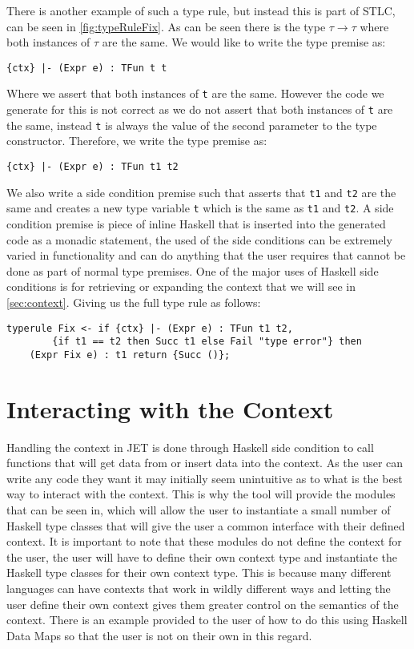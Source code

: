 There is another example of such a type rule, but instead this is part of STLC, can be seen in \autoref{fig:typeRuleFix}.
As can be seen there is the type $\tau \rightarrow \tau$ where both instances of $\tau$ are the same.
We would like to write the type premise as:
\begin{lstlisting}[numbers=none]
{ctx} |- (Expr e) : TFun t t
\end{lstlisting}
Where we assert that both instances of \texttt{t} are the same.
However the code we generate for this is not correct as we do not assert that both instances of \texttt{t} are the same, instead \texttt{t} is always the value of the second parameter to the type constructor.
Therefore, we write the type premise as:
\begin{lstlisting}
{ctx} |- (Expr e) : TFun t1 t2
\end{lstlisting}
We also write a side condition premise such that asserts that \texttt{t1} and \texttt{t2} are the same and creates a new type variable \texttt{t} which is the same as \texttt{t1} and \texttt{t2}.
A side condition premise is piece of inline Haskell that is inserted into the generated code as a monadic statement, the used of the side conditions can be extremely varied in functionality and can do anything that the user requires that cannot be done as part of normal type premises.
One of the major uses of Haskell side conditions is for retrieving or expanding the context that we will see in \autoref{sec:context}.
Giving us the full type rule as follows:
\begin{lstlisting}
typerule Fix <- if {ctx} |- (Expr e) : TFun t1 t2, 
        {if t1 == t2 then Succ t1 else Fail "type error"} then 
    (Expr Fix e) : t1 return {Succ ()};
\end{lstlisting}

\section{Interacting with the Context}
\label{sec:context}
Handling the context in JET is done through Haskell side condition to call functions that will get data from or insert data into the context.
As the user can write any code they want it may initially seem unintuitive as to what is the best way to interact with the context.
This is why the tool will provide the modules that can be seen in, which will allow the user to instantiate a small number of Haskell type classes that will give the user a common interface with their defined context.
It is important to note that these modules do not define the context for the user, the user will have to define their own context type and instantiate the Haskell type classes for their own context type.
This is because many different languages can have contexts that work in wildly different ways and letting the user define their own context gives them greater control on the semantics of the context.
There is an example provided to the user of how to do this using Haskell Data Maps so that the user is not on their own in this regard.
